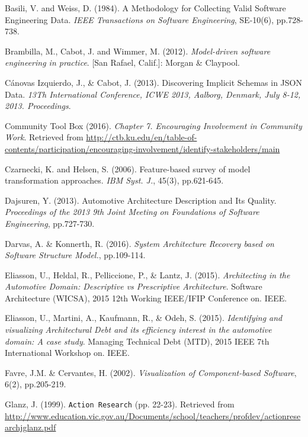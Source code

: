 \begin{thebibliography}{69}

Basili, V. and Weiss, D. (1984). A Methodology for Collecting Valid Software Engineering Data. \textit{IEEE Transactions on Software Engineering}, SE-10(6), pp.728-738.

Brambilla, M., Cabot, J. and Wimmer, M. (2012). \textit{Model-driven software engineering in practice}. [San Rafael, Calif.]: Morgan \& Claypool.

Cánovas Izquierdo, J., \& Cabot, J. (2013). Discovering Implicit Schemas in JSON Data. \textit{13Th International Conference, ICWE 2013, Aalborg, Denmark, July 8-12, 2013. Proceedings}.

Community Tool Box (2016). \textit{Chapter 7. Encouraging Involvement in Community Work}. Retrieved from \url{http://ctb.ku.edu/en/table-of-contents/participation/encouraging-involvement/identify-stakeholders/main}

Czarnecki, K. and Helsen, S. (2006). Feature-based survey of model transformation approaches. \textit{IBM Syst. J.}, 45(3), pp.621-645.

Dajsuren, Y. (2013). Automotive Architecture Description and Its Quality. \textit{Proceedings of the 2013 9th Joint Meeting on Foundations of Software Engineering}, pp.727-730. 

Darvas, A. \& Konnerth, R. (2016). \textit{System Architecture Recovery based on Software Structure Model.}, pp.109-114.

Eliasson, U., Heldal, R., Pelliccione, P., \& Lantz, J. (2015). \textit{Architecting in the Automotive Domain: Descriptive vs Prescriptive Architecture}. Software Architecture (WICSA), 2015 12th Working IEEE/IFIP Conference on. IEEE.

Eliasson, U., Martini, A., Kaufmann, R., \& Odeh, S. (2015). \textit{Identifying and visualizing Architectural Debt and its efficiency interest in the automotive domain: A case study}. Managing Technical Debt (MTD), 2015 IEEE 7th International Workshop on. IEEE.

Favre, J.M. \& Cervantes, H. (2002). \textit{Visualization of Component-based Software}, 6(2), pp.205-219.

Glanz, J. (1999). \texttt{Action Research} (pp. 22-23). Retrieved from \url{http://www.education.vic.gov.au/Documents/school/teachers/profdev/actionresearchjglanz.pdf}


\end{thebibliography}
